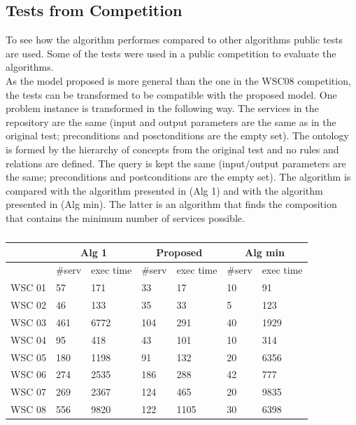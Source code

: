 \documentclass[12pt]{article}
\theoremstyle{definition}
\begin{document}
		\subsection{Tests from Competition}
		To see how the algorithm performes compared to other algorithms public tests are used. Some of the tests were used in a public competition \cite{survey} to evaluate the algorithms.\\
		As the model proposed is more general than the one in the WSC08 competition, the tests can be transformed to be compatible with the proposed model. 
		One problem instance is transformed in the following way. The services in the repository are the same (input and output parameters are the same as in the original test; preconditions and posctonditions are the empty set). The ontology is formed by the hierarchy of concepts from the original test and no rules and relations are defined. The query is kept the same (input/output parameters are the same; preconditions and postconditions are the empty set).
		The algorithm is compared with the algorithm presented in \cite{paulRelational} (Alg 1) and with the algorithm presented in \cite{spanioli} (Alg min). The latter is an algorithm that finds the composition that contains the minimum number of services possible.
		\begin{table}[!h]
			\centering
			\begin{tabular}{|l|l|l|l|l|l|l|}
				\hline
				& \multicolumn{2}{c|}{Alg 1} & \multicolumn{2}{c|}{Proposed} & \multicolumn{2}{c|}{Alg min} \\ \hline
				& \#serv      & exec time      & \#serv      & exec time      & \#serv    & exec time   \\ \hline
				WSC 01 & 57           & 171            & 33           & 17             & 10         & 91          \\ \hline
				WSC 02 & 46           & 133            & 35           & 33             & 5          & 123         \\ \hline
				WSC 03 & 461          & 6772           & 104          & 291            & 40         & 1929        \\ \hline
				WSC 04 & 95           & 418            & 43           & 101            & 10         & 314         \\ \hline
				WSC 05 & 180          & 1198           & 91           & 132            & 20         & 6356        \\ \hline
				WSC 06 & 274          & 2535           & 186          & 288            & 42         & 777         \\ \hline
				WSC 07 & 269          & 2367           & 124          & 465            & 20         & 9835        \\ \hline
				WSC 08 & 556          & 9820           & 122          & 1105           & 30         & 6398        \\ \hline
			\end{tabular}
			\caption{}
			\label{table:transformed}
		\end{table}
\end{document}
